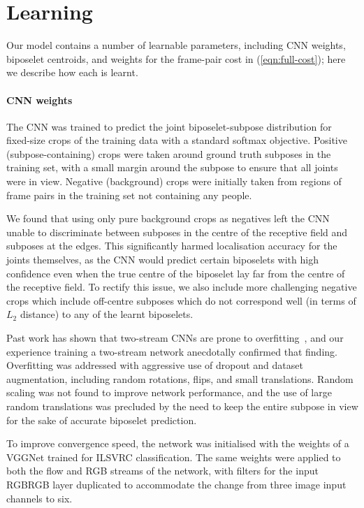 \documentclass[runningheads]{llncs}
\begin{document}
\section{Learning}\label{sec:learning}

Our model contains a number of learnable parameters, including CNN weights,
biposelet centroids, and weights for the frame-pair cost in
(\ref{eqn:full-cost}); here we describe how each is learnt.

\paragraph{CNN weights} The CNN was trained to predict the joint
biposelet-subpose distribution for fixed-size crops of the training data with a
standard softmax objective. Positive (subpose-containing) crops were taken
around ground truth subposes in the training set, with a small margin around the
subpose to ensure that all joints were in view. Negative (background) crops were
initially taken from regions of frame pairs in the training set not containing
any people.

We found that using only pure background crops as negatives left the CNN unable
to discriminate between subposes in the centre of the receptive field and
subposes at the edges. This significantly harmed localisation accuracy for the
joints themselves, as the CNN would predict certain biposelets with high
confidence even when the true centre of the biposelet lay far from the centre of
the receptive field. To rectify this issue, we also include more challenging
negative crops which include off-centre subposes which do not correspond well
(in terms of $L_2$ distance) to any of the learnt biposelets.

Past work has shown that two-stream CNNs are prone to
overfitting~\cite{wang2015towards}, and our experience training a two-stream
network anecdotally confirmed that finding. Overfitting was addressed with
aggressive use of dropout and dataset augmentation, including random rotations,
flips, and small translations. Random scaling was not found to improve network
performance, and the use of large random translations was precluded by the need
to keep the entire subpose in view for the sake of accurate biposelet
prediction.

To improve convergence speed, the network was initialised with the weights of a
VGGNet trained for ILSVRC classification. The same weights were applied to both
the flow and RGB streams of the network, with filters for the input RGBRGB layer
duplicated to accommodate the change from three image input channels to six.
\end{document}
